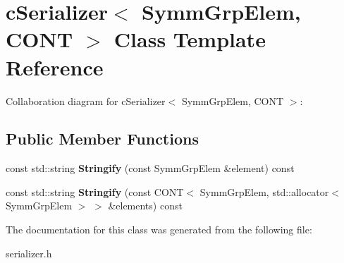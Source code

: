 \hypertarget{classcSerializer_3_01SymmGrpElem_00_01CONT_01_4}{\section{c\-Serializer$<$ Symm\-Grp\-Elem, C\-O\-N\-T $>$ Class Template Reference}
\label{classcSerializer_3_01SymmGrpElem_00_01CONT_01_4}
}


Collaboration diagram for c\-Serializer$<$ Symm\-Grp\-Elem, C\-O\-N\-T $>$\-:
\subsection*{Public Member Functions}
\begin{DoxyCompactItemize}
\item 
\hypertarget{classcSerializer_3_01SymmGrpElem_00_01CONT_01_4_a9f2b83d7cb75cfad5bd2a1c15fa968c1}{const std\-::string {\bfseries Stringify} (const Symm\-Grp\-Elem \&element) const }\label{classcSerializer_3_01SymmGrpElem_00_01CONT_01_4_a9f2b83d7cb75cfad5bd2a1c15fa968c1}

\item 
\hypertarget{classcSerializer_3_01SymmGrpElem_00_01CONT_01_4_adc87f8732b096f7add2f18f486bada73}{const std\-::string {\bfseries Stringify} (const C\-O\-N\-T$<$ Symm\-Grp\-Elem, std\-::allocator$<$ Symm\-Grp\-Elem $>$ $>$ \&elements) const }\label{classcSerializer_3_01SymmGrpElem_00_01CONT_01_4_adc87f8732b096f7add2f18f486bada73}

\end{DoxyCompactItemize}


The documentation for this class was generated from the following file\-:\begin{DoxyCompactItemize}
\item 
serializer.\-h\end{DoxyCompactItemize}
